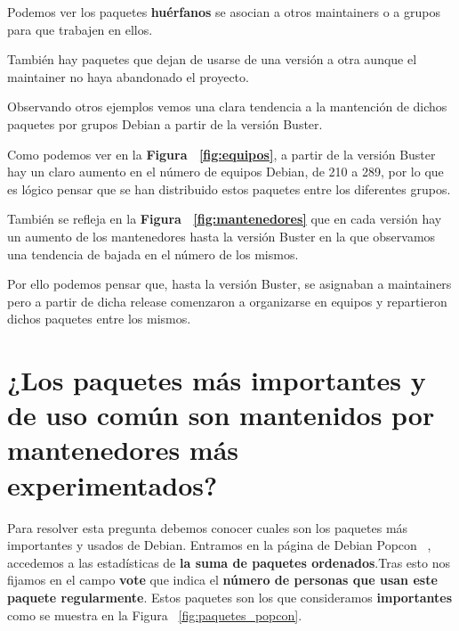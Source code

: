 \documentclass[a4paper, 12pt]{book}
\begin{document}
Podemos ver los paquetes \textbf{huérfanos} se asocian a otros maintainers o a grupos para que trabajen en ellos. 

También hay paquetes que dejan de usarse de una versión a otra aunque el maintainer no haya abandonado el proyecto.

Observando otros ejemplos vemos una clara tendencia a la mantención de dichos paquetes por grupos Debian a partir de la versión Buster.

Como podemos ver en la \textbf{Figura ~\ref{fig:equipos}}, a partir de la versión Buster hay un claro aumento en el número de equipos Debian, de 210 a 289, por lo que es lógico pensar que se han distribuido estos paquetes entre los diferentes grupos.

También se refleja en la \textbf{Figura ~\ref{fig:mantenedores}} que en cada versión hay un aumento de los mantenedores hasta la versión Buster en la que observamos una tendencia de bajada en el número de los mismos.

Por ello podemos pensar que, hasta la versión Buster, se asignaban a maintainers pero a partir de dicha release comenzaron a organizarse en equipos y repartieron dichos paquetes entre los mismos.


\section{¿Los paquetes más importantes y de uso común son mantenidos por mantenedores más experimentados?}
\label{sec:pregunta_6}

Para resolver esta pregunta debemos conocer cuales son los paquetes más importantes y usados de Debian. Entramos en la página de Debian Popcon ~\cite{debian:_popcon}, accedemos a las estadísticas de \textbf{la suma de paquetes ordenados}.Tras esto nos fijamos en el campo \textbf{vote} que indica el \textbf{número de personas que usan este paquete regularmente}. Estos paquetes son los que consideramos \textbf{importantes} como se muestra en la Figura ~\ref{fig:paquetes_popcon}.
\end{document}
